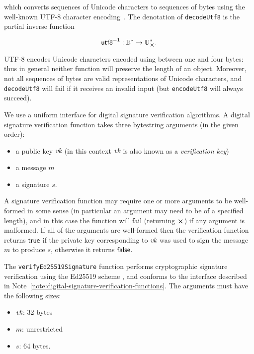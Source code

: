 \noindent which converts sequences of Unicode characters to sequences of bytes using the
well-known UTF-8 character encoding~\cite[Definition  D92]{Unicode-standard}.
The denotation of \texttt{decodeUtf8} is the partial inverse function

$$
\unutfeight: \B^* \rightarrow \U^*_{\errorX}.
$$

\noindent UTF-8 encodes Unicode characters encoded using between one and four
bytes: thus in general neither function will preserve the length of an object.
Moreover, not all sequences of bytes are valid representations of Unicode
characters, and \texttt{decodeUtf8} will fail if it receives an invalid input
(but \texttt{encodeUtf8} will always succeed).




\label{note:digital-signature-verification-functions}
We use a uniform interface for digital signature verification algorithms. A
digital signature verification function takes three bytestring arguments (in the
given order):
\begin{itemize}
  \item a public key $\textit{vk}$ (in this context $\textit{vk}$ is also known as a \textit{verification key})
  \item a message $m$
  \item a signature  $s$.
\end{itemize}
\noindent A signature verification function may require one
or more arguments to be well-formed in some sense (in particular an argument
may need to be of a specified length), and in this case the function will fail
(returning $\errorX$) if any argument is malformed. If all of the arguments are
well-formed then the verification function returns $\mathsf{true}$ if the private
key corresponding to $\textit{vk}$ was used to sign the message $m$ to produce $s$,
otherwise it returns $\mathsf{false}$.

\label{note:ed25519-signature-verification}
The \texttt{verifyEd25519Signature}
function performs cryptographic
signature verification using the Ed25519 scheme \cite{ches-2011-24091,
  rfc8032-EdDSA}, and conforms to the interface described in
Note~\ref{note:digital-signature-verification-functions}.  The arguments must
have the following sizes:
\begin{itemize}
\item $\textit{vk}$: 32 bytes
\item $m$: unrestricted
\item $s$: 64 bytes.
\end{itemize}

